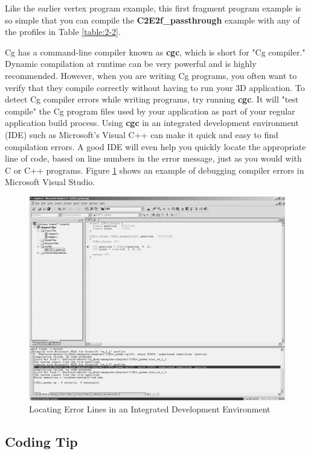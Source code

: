 \documentclass{book}
\begin{document}
Like the earlier vertex program example, this first fragment program example is so simple that you can compile the \textbf{C2E2f\_passthrough} example with any of the profiles in Table \ref{table:2-2}.

Cg has a command-line compiler known as \textbf{cgc}, which is short for "Cg compiler." Dynamic compilation at runtime can be very powerful and is highly recommended. However, when you are writing Cg programs, you often want to verify that they compile correctly without having to run your 3D application. To detect Cg compiler errors while writing programs, try running \textbf{cgc}. It will "test compile" the Cg program files used by your application as part of your regular application build process. Using \textbf{cgc} in an integrated development environment (IDE) such as Microsoft's Visual C++ can make it quick and easy to find compilation errors. A good IDE will even help you quickly locate the appropriate line of code, based on line numbers in the error message, just as you would with C or C++ programs. Figure \ref{fig:2-3} shows an example of debugging compiler errors in Microsoft Visual Studio.

\begin{figure}
    \centering
    \includegraphics[width=1\linewidth]{Images/fig2_3.jpg}
    \caption{Locating Error Lines in an Integrated Development Environment}
    \label{fig:2-3}
\end{figure}

\subsection*{Coding Tip}
\end{document}
